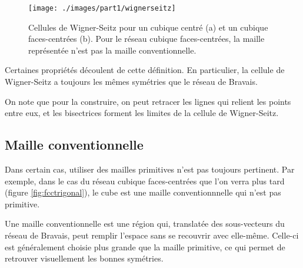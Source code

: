 \begin{figure}
\texttt{[image: ./images/part1/wignerseitz]}
\caption{Cellules de Wigner-Seitz pour un cubique centré (a) et un cubique faces-centrées (b). Pour le réseau cubique faces-centrées, la maille représentée n'est pas la maille conventionnelle.}
\label{fig:ws}
\end{figure}

Certaines propriétés découlent de cette définition. En particulier, la cellule de Wigner-Seitz a toujours les mêmes symétries que le réseau de Bravais.

On note que pour la construire, on peut retracer les lignes qui relient les points entre eux, et les bisectrices forment les limites de la cellule de Wigner-Seitz.

\subsection{Maille conventionnelle}

Dans certain cas, utiliser des mailles primitives n'est pas toujours pertinent. Par exemple, dans le cas du réseau cubique faces-centrées que l'on verra plus tard (figure \ref{fig:fcctrigonal}), le cube est une maille conventionnnelle qui n'est pas primitive.

Une maille conventionnelle est une région qui, translatée des sous-vecteurs du réseau de Bravais, peut remplir l'espace sans se recouvrir avec elle-même. Celle-ci est généralement choisie plus grande que la maille primitive, ce qui permet de retrouver visuellement les bonnes symétries.
